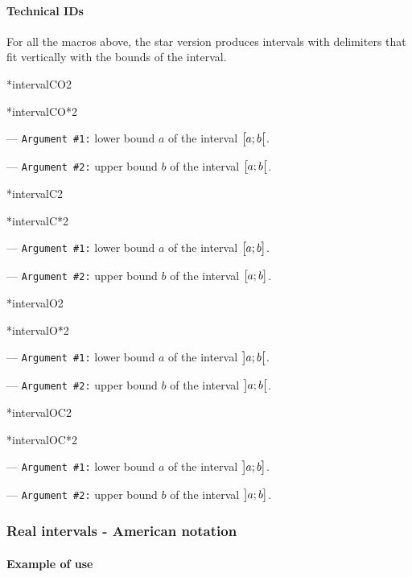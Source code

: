 \documentclass[12pt,a4paper]{article}
\makeatletter
\newcommand\IDmacro{\@ifstar{\@IDmacroStar}{\@IDmacroNoStar}}
\newcommand\@IDmacroNoStar[3]{%
        \texttt{%
        	\textbackslash#1%
        	\IfStrEq{#2}{0}{}{%
        		\,\,[#2 Option%
				\IfStrEq{#2}{1}{}{s}]%
			}%
    	    \,\,(#3 Argument%
				\IfStrEq{#3}{1}{}{s})%
	   	}
        \immediate\write\tempfile{macro@#1@#2@#3}%
    }
\newcommand\@IDmacroStar[2]{%
        \@IDmacroNoStar{#1}{0}{#2}%
    }
\newcommand\@IDoptarg[2]{%
    	\vspace{0.5em}
		--- \texttt{#1 \##2:}%
	}
\newcommand\IDarg[1]{%
    	\@IDoptarg{Argument}{#1}%
	}
\makeatother
\begin{document}
		\paragraph{Technical IDs}

For all the macros above, the star version produces intervals with delimiters that fit vertically with the bounds of the interval.

\medskip


\medskip

\IDmacro*{intervalCO}{2}

\IDmacro*{intervalCO*}{2}

\IDarg{1} lower bound $a$ of the interval $\intervalCO{a}{b}$.

\IDarg{2} upper bound $b$ of the interval $\intervalCO{a}{b}$.

\medskip

\IDmacro*{intervalC}{2}

\IDmacro*{intervalC*}{2}

\IDarg{1} lower bound $a$ of the interval $\intervalC{a}{b}$.

\IDarg{2} upper bound $b$ of the interval $\intervalC{a}{b}$.

\medskip

\IDmacro*{intervalO}{2}

\IDmacro*{intervalO*}{2}

\IDarg{1} lower bound $a$ of the interval $\intervalO{a}{b}$.

\IDarg{2} upper bound $b$ of the interval $\intervalO{a}{b}$.

\medskip

\IDmacro*{intervalOC}{2}

\IDmacro*{intervalOC*}{2}

\IDarg{1} lower bound $a$ of the interval $\intervalOC{a}{b}$.

\IDarg{2} upper bound $b$ of the interval $\intervalOC{a}{b}$.




    \subsubsection{Real intervals - American notation}

		\paragraph{Example of use}
\end{document}
